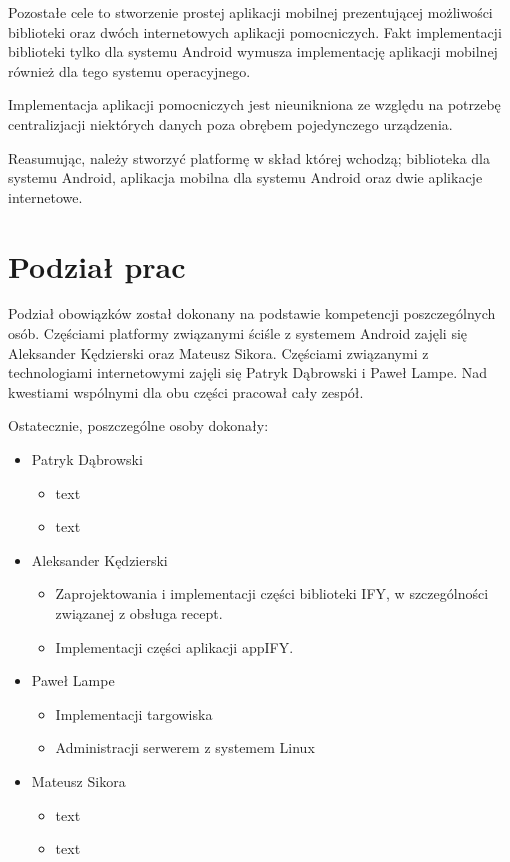 \documentclass[11pt,a4paper,polish,thesis]{dcsbook}
\begin{document}
Pozostałe cele to stworzenie prostej aplikacji mobilnej prezentującej możliwości biblioteki oraz dwóch internetowych aplikacji pomocniczych. Fakt implementacji
biblioteki tylko dla systemu Android wymusza implementację aplikacji mobilnej również dla tego systemu operacyjnego.

Implementacja aplikacji pomocniczych jest nieunikniona ze względu na potrzebę centralizjacji niektórych danych poza obrębem pojedynczego urządzenia.

Reasumując, należy stworzyć platformę w skład której wchodzą; biblioteka dla systemu Android, aplikacja mobilna dla systemu Android oraz dwie aplikacje internetowe.
\section{Podział prac}
Podział obowiązków został dokonany na podstawie kompetencji poszczególnych osób. Częściami platformy związanymi ściśle z systemem Android zajęli się Aleksander
Kędzierski oraz Mateusz Sikora. Częściami związanymi z technologiami internetowymi zajęli się Patryk Dąbrowski i Paweł Lampe. Nad kwestiami wspólnymi dla obu części
pracował cały zespół.

Ostatecznie, poszczególne osoby dokonały:
\begin{itemize}
\item Patryk Dąbrowski
\begin{itemize}
\item text
\item text
\end{itemize}
\item Aleksander Kędzierski
\begin{itemize}
\item Zaprojektowania i implementacji części biblioteki IFY, w szczególności związanej z obsługa recept.
\item Implementacji części aplikacji appIFY.
\end{itemize}
\item Paweł Lampe
\begin{itemize}
\item Implementacji targowiska
\item Administracji serwerem z systemem Linux
\end{itemize}
\item Mateusz Sikora
\begin{itemize}
\item text
\item text
\end{itemize}
\end{itemize}
\end{document}
